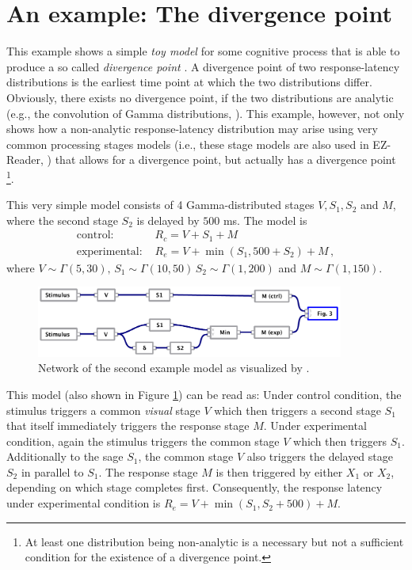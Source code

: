 \section{An example: The divergence point}
This example shows a simple \emph{toy model} for some cognitive process that is able to produce a
so called \emph{divergence point} \cite[e.g.,][]{Reingold2012}. A divergence point of two response-latency
distributions is the earliest time point at which the two distributions differ. Obviously, 
there exists no divergence point, if the two distributions are analytic 
(e.g., the convolution of Gamma distributions, \cite{Gelooven1999}). This example, however,
not only shows how a non-analytic response-latency distribution may arise using very common
processing stages models (i.e., these stage models are also used in EZ-Reader, \cite{Reichle2003}) 
that allows for a divergence point, but actually has a divergence point%
\footnote{At least one distribution being non-analytic is a necessary but not a sufficient
condition for the existence of a divergence point.}. 

This very simple model consists of 4 Gamma-distributed stages $V, S_1, S_2$ and $M$,
where the second stage $S_2$ is delayed by $500$ ms. 
The model is
\begin{align}
 \text{control: } & R_c = V + S_1 + M \\
 \text{experimental: } & R_e = V + \min(S_1, 500+S_2) + M\,,
\end{align}
where $V \sim \Gamma(5,30),\,S_1\sim\Gamma(10,50)\,S_2\sim\Gamma(1,200)$ and $M\sim\Gamma(1,150)$.
\begin{figure}[!ht]
 \centering
 \includegraphics[width=0.9\textwidth]{fig/example2.pdf}
 \caption{Network of the second example model as visualized by .} \label{fig:example2}
\end{figure}

This model (also shown in Figure \ref{fig:example2}) can be read as: Under control condition, the stimulus triggers a common \emph{visual} 
stage $V$ which then triggers a second stage $S_1$ that itself immediately triggers the response stage $M$. Under experimental condition,
again the stimulus triggers the common stage $V$ which then triggers $S_1$. Additionally to the sage $S_1$, the common
stage $V$ also triggers the delayed stage $S_2$ in parallel to $S_1$. The response stage $M$ is then triggered by 
either $X_1$ or $X_2$, depending on which stage completes first. Consequently, the response latency
under experimental condition is $R_e = V + \min(S_1,S_2+500) + M$.

